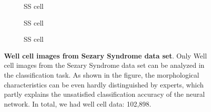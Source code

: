 \begin{figure}[ht]
\begin{center}
\begin{subfigure}[b]{0.25\textwidth}
			\label{fig:Outside FOV}
			\caption{SS cell}
		\end{subfigure}
		\begin{subfigure}[b]{0.25\textwidth}
			\label{fig:Contaminated}
			\caption{SS cell}
		\end{subfigure}
		\begin{subfigure}[b]{0.25\textwidth}
			\label{fig:Good Cell}
			\caption{SS cell}
		\end{subfigure}
		
	\end{center}
	\caption{\textbf{Well cell images from Sezary Syndrome data set}. Only Well cell images from the Sezary Syndrome data set can be analyzed in the classification task. As shown in the figure, the morphological characteristics can be even hardly distinguished by experts, which partly explains the unsatisfied classification accuracy of the neural network. In total, we had well cell data: 102,898.}
	\label{fig:lennas}
\end{figure}

